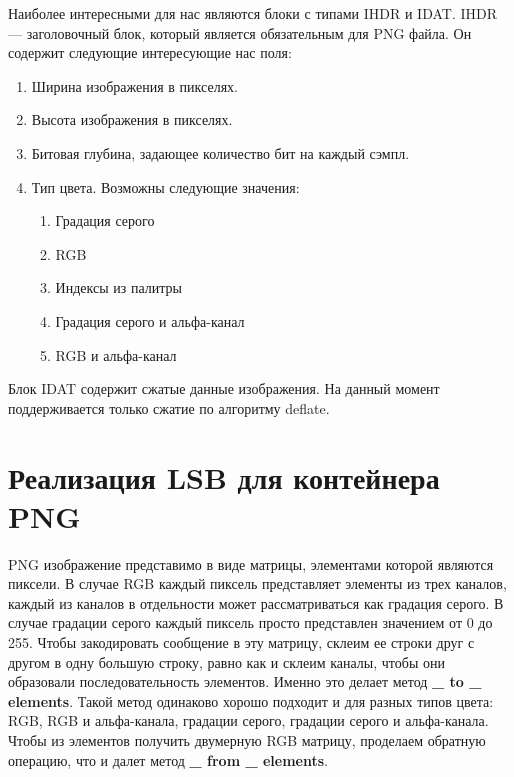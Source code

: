 Наиболее интересными для нас являются блоки с типами IHDR и IDAT.
IHDR --- заголовочный блок, который является обязательным для PNG файла.
Он содержит следующие интересующие нас поля:
\begin{enumerate}
    \item Ширина изображения в пикселях.
    \item Высота изображения в пикселях.
    \item Битовая глубина, задающее количество бит на каждый сэмпл.
    \item Тип цвета. Возможны следующие значения:
    \begin{enumerate}
        \item Градация серого
        \item RGB
        \item Индексы из палитры
        \item Градация серого и альфа-канал
        \item RGB и альфа-канал
    \end{enumerate}
\end{enumerate}

Блок IDAT содержит сжатые данные изображения.
На данный момент поддерживается только сжатие по алгоритму deflate.

\section{Реализация LSB для контейнера PNG}
PNG изображение представимо в виде матрицы, элементами которой являются пиксели.
В случае RGB каждый пиксель представляет элементы из трех каналов, каждый из каналов
в отдельности может рассматриваться как градация серого. В случае градации серого каждый
пиксель просто представлен значением от 0 до 255.
Чтобы закодировать сообщение в эту матрицу, склеим ее строки друг с другом в одну большую строку,
равно как и склеим каналы, чтобы они образовали последовательность элементов.
Именно это делает метод \textbf{\_ to \_ elements}.
Такой метод одинаково хорошо подходит и для разных типов цвета: RGB, RGB и альфа-канала,
градации серого, градации серого и альфа-канала.
Чтобы из элементов получить двумерную RGB матрицу,
проделаем обратную операцию, что и далет метод \textbf{\_ from \_ elements}.

